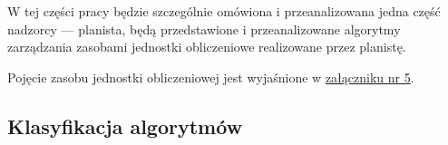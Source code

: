 \documentclass[../../main]{subfiles}
\begin{document}
W tej części pracy będzie szczególnie omówiona i przeanalizowana jedna część nadzorcy — planista, będą przedstawione i przeanalizowane algorytmy zarządzania zasobami jednostki obliczeniowe realizowane przez planistę.

Pojęcie zasobu jednostki obliczeniowej jest wyjaśnione w \hyperref[sec:zalacznik-5]{załączniku nr 5}.

\subsection{Klasyfikacja algorytmów}
\end{document}

